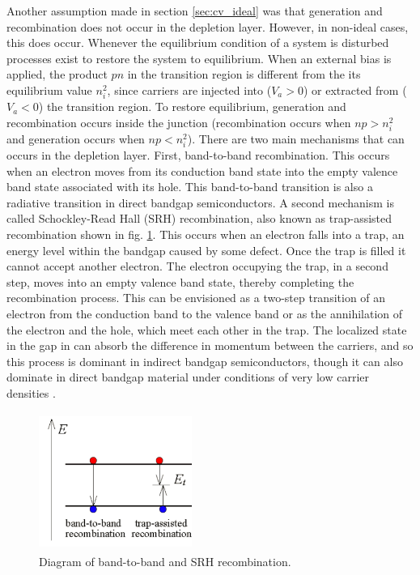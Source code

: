 \documentclass[%
 reprint,
 amsmath,amssymb,
 aps,
pra,
floatfix,
]{revtex4-1}
\begin{document}
%
Another assumption made in section \ref{sec:cv_ideal} was that generation and recombination does not occur in the depletion 
layer. However, in non-ideal cases, this does occur. Whenever the equilibrium condition of a system is disturbed processes exist to restore
the system to equilibrium. When an external bias is applied, the product $pn$ in the transition region is different from the its equilibrium value
$n_i^2$, since carriers are injected into ($V_a>0$) or extracted from ($V_a<0$) the transition region. 
To restore equilibrium, generation and recombination occurs inside the junction (recombination occurs when $np > n_i^2$ and generation occurs when $np < n_i^2$).
There are two main mechanisms that can occurs in the depletion layer. First, band-to-band recombination. This occurs when an electron
moves from its conduction band state into the empty valence band state associated with its hole. This band-to-band transition is also a radiative transition in direct
bandgap semiconductors. A second mechanism is called Schockley-Read Hall (SRH) recombination, also known as trap-assisted recombination shown in fig. \ref{fig:fig7}.
This occurs when an electron falls into a trap, an energy level within the bandgap caused by some defect. Once the trap is filled it cannot accept another electron.
The electron occupying the trap, in a second step, moves into an empty valence band state, thereby completing the recombination process. This can be envisioned
as a two-step transition of an electron from the conduction band to the valence band or as the annihilation of the electron and the hole, which meet each other in the trap.
The localized state in the gap in can absorb the difference in momentum between the carriers, and so this process is dominant
in indirect bandgap semiconductors, though it can also dominate in direct bandgap material under conditions of very low 
carrier densities \cite{Colinge2002}. 
%
\begin{figure}[h!]
    \centering
    \includegraphics[height=4.5cm,width=5cm]{figs/recomb}
    \caption{Diagram of band-to-band and SRH recombination.}
    \label{fig:fig7}
\end{figure}
\end{document}

